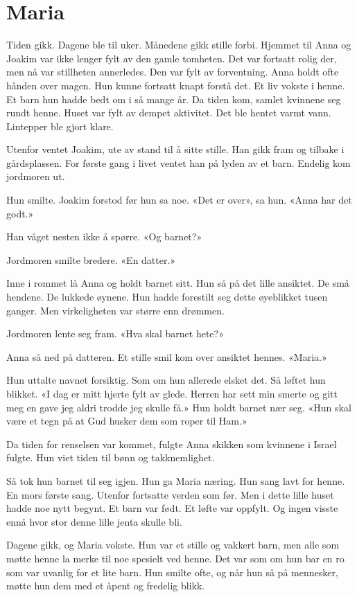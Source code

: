 \chapter{Maria}



Tiden gikk.
Dagene ble til uker.
Månedene gikk stille forbi.
Hjemmet til Anna og Joakim var ikke lenger fylt av den gamle tomheten.
Det var fortsatt rolig der, men nå var stillheten annerledes.
Den var fylt av forventning.
Anna holdt ofte hånden over magen.
Hun kunne fortsatt knapt forstå det.
Et liv vokste i henne.
Et barn hun hadde bedt om i så mange år.
Da tiden kom, samlet kvinnene seg rundt henne.
Huset var fylt av dempet aktivitet.
Det ble hentet varmt vann.
Lintepper ble gjort klare.

Utenfor ventet Joakim, ute av stand til å sitte stille.
Han gikk fram og tilbake i gårdsplassen.
For første gang i livet ventet han på lyden av et barn.
Endelig kom jordmoren ut.

Hun smilte.
Joakim forstod før hun sa noe.
«Det er over», sa hun. «Anna har det godt.»

Han våget nesten ikke å spørre.
«Og barnet?»

Jordmoren smilte bredere.
«En datter.»

Inne i rommet lå Anna og holdt barnet sitt.
Hun så på det lille ansiktet.
De små hendene.
De lukkede øynene.
Hun hadde forestilt seg dette øyeblikket tusen ganger.
Men virkeligheten var større enn drømmen.

Jordmoren lente seg fram.
«Hva skal barnet hete?»

Anna så ned på datteren.
Et stille smil kom over ansiktet hennes.
«Maria.»

Hun uttalte navnet forsiktig.
Som om hun allerede elsket det.
Så løftet hun blikket.
«I dag er mitt hjerte fylt av glede.
Herren har sett min smerte og gitt meg en gave jeg aldri trodde jeg skulle få.»
Hun holdt barnet nær seg.
«Hun skal være et tegn på at Gud husker dem som roper til Ham.»

Da tiden for renselsen var kommet,
fulgte Anna skikken som kvinnene i Israel fulgte.
Hun viet tiden til bønn og takknemlighet.

Så tok hun barnet til seg igjen.
Hun ga Maria næring.
Hun sang lavt for henne.
En mors første sang.
Utenfor fortsatte verden som før.
Men i dette lille huset hadde noe nytt begynt.
Et barn var født.
Et løfte var oppfylt.
Og ingen visste ennå hvor stor denne lille jenta skulle bli.

Dagene gikk, og Maria vokste.
Hun var et stille og vakkert barn, men alle som møtte
henne la merke til noe spesielt ved henne. Det var som om hun
bar en ro som var uvanlig for et lite barn.
Hun smilte ofte, og når hun så på mennesker,
møtte hun dem med et åpent og fredelig blikk.

